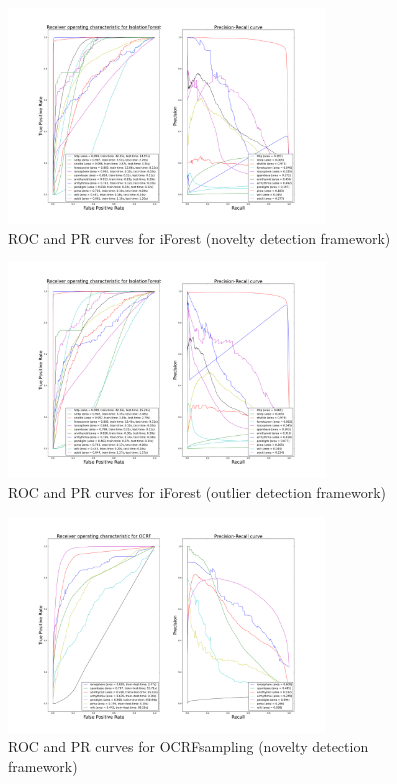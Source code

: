 \begin{figure}[!ht]
    \caption{\acs{ROC} and \acs{PR} curves for \acs{iForest} (novelty detection
    framework)}
    \label{ocrf:fig:iforest_roc_pr}
    \centering
    \includegraphics[trim=175 80 175 123, clip,
    width=0.75\textwidth]{./gfx/bench_iforest_roc_pr_supervised_factorized.png}
\end{figure}
\begin{figure}[!ht]
    \caption{\acs{ROC} and \acs{PR} curves for \acs{iForest} (outlier detection
    framework)}
    \label{ocrf:fig:iforest_roc_pr_unsupervised}
    \centering
    \includegraphics[trim=175 80 175 123, clip,
    width=0.75\textwidth]{./gfx/bench_iforest_roc_pr_unsupervised_factorized.png}
\end{figure}
\begin{figure}[!ht]
    \caption{\acs{ROC} and \acs{PR} curves for \acs{OCRFsampling} (novelty
    detection framework)}
    \label{ocrf:fig:ocrfm_roc_pr}
    \centering
    \includegraphics[trim=175 80 175 123, clip,
    width=0.75\textwidth]{./gfx/bench_ocrf_roc_pr_supervised_factorized.png}
\end{figure}
